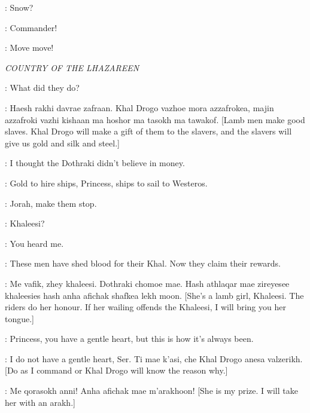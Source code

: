 \JEOR: Snow? 

\JON: Commander! 


\JON: Move move! 


\scene

\textit{COUNTRY OF THE LHAZAREEN}


\DAENERYS: What did they do? 

\RAKHARO: Haesh rakhi davrae zafraan. Khal Drogo vazhoe mora azzafrokea, majin azzafroki vazhi kishaan ma hoshor ma tasokh ma tawakof. [Lamb men make good slaves. Khal Drogo will make a gift of them to the slavers, and the slavers will give us gold and silk and steel.] 

\DAENERYS: I thought the Dothraki didn't believe in money. 

\JORAH: Gold to hire ships, Princess, ships to sail to Westeros. 


\DAENERYS: Jorah, make them stop. 

\JORAH: Khaleesi? 

\DAENERYS: You heard me. 

\JORAH: These men have shed blood for their Khal. Now they claim their rewards. 

\RAKHARO: Me vafik, zhey khaleesi. Dothraki chomoe mae. Hash athlaqar mae zireyesee khaleesies hash anha afichak shafkea lekh moon. [She's a lamb girl, Khaleesi. The riders do her honour. If her wailing offends the Khaleesi, I will bring you her tongue.] 

\JORAH: Princess, you have a gentle heart, but this is how it's always been. 

\DAENERYS: I do not have a gentle heart, Ser. Ti mae k'asi, che Khal Drogo anesa valzerikh. [Do as I command or Khal Drogo will know the reason why.]


\MAGO: Me qorasokh anni! Anha afichak mae m'arakhoon! [She is my prize. I will take her with an arakh.] 

